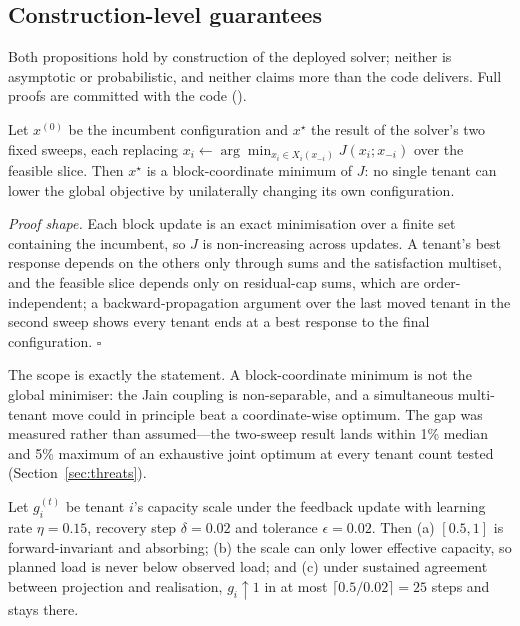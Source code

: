 \subsection{Construction-level guarantees}
\label{sec:design-theory}

Both propositions hold by construction of the deployed solver; neither is
asymptotic or probabilistic, and neither claims more than the code
delivers. Full proofs are committed with the code
().

\begin{proposition}
\label{prop:bco}
Let $x^{(0)}$ be the incumbent configuration and $x^\star$ the result of
the solver's two fixed sweeps, each replacing $x_i \leftarrow
\arg\min_{x_i \in X_i(x_{-i})} J(x_i; x_{-i})$ over the feasible slice.
Then $x^\star$ is a block-coordinate minimum of $J$: no single tenant can
lower the global objective by unilaterally changing its own configuration.
\end{proposition}

\emph{Proof shape.} Each block update is an exact minimisation over a
finite set containing the incumbent, so $J$ is non-increasing across
updates. A tenant's best response depends on the others only through sums
and the satisfaction multiset, and the feasible slice depends only on
residual-cap sums, which are order-independent; a backward-propagation
argument over the last moved tenant in the second sweep shows every tenant
ends at a best response to the final configuration. $\square$

The scope is exactly the statement. A block-coordinate minimum is not the
global minimiser: the Jain coupling is non-separable, and a simultaneous
multi-tenant move could in principle beat a coordinate-wise optimum. The
gap was measured rather than assumed---the two-sweep result lands within
1\% median and 5\% maximum of an exhaustive joint optimum at every tenant
count tested (Section~\ref{sec:threats}).

\begin{proposition}
\label{prop:calibration}
Let $g_i^{(t)}$ be tenant $i$'s capacity scale under the feedback update
with learning rate $\eta = 0.15$, recovery step $\delta = 0.02$ and
tolerance $\epsilon = 0.02$. Then (a) $[0.5, 1]$ is forward-invariant and
absorbing; (b) the scale can only lower effective capacity, so planned load
is never below observed load; and (c) under sustained agreement between
projection and realisation, $g_i \uparrow 1$ in at most $\lceil 0.5/0.02
\rceil = 25$ steps and stays there.
\end{proposition}

